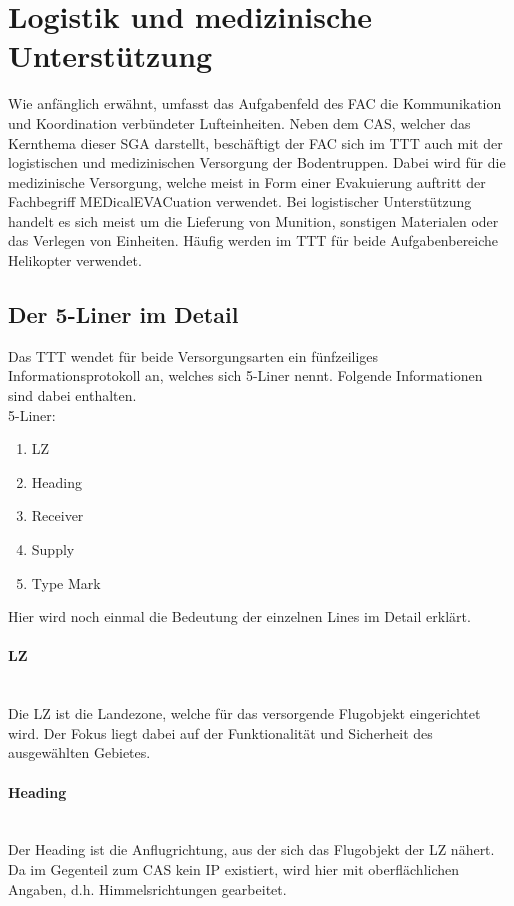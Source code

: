 \section{Logistik und medizinische Unterstützung}
Wie anfänglich erwähnt, umfasst das Aufgabenfeld des FAC die Kommunikation und
Koordination verbündeter Lufteinheiten. Neben dem CAS, welcher das Kernthema dieser
SGA darstellt, beschäftigt der FAC sich im TTT auch mit der logistischen und
medizinischen Versorgung der Bodentruppen. Dabei wird für die medizinische Versorgung,
welche meist in Form einer Evakuierung auftritt der Fachbegriff MEDicalEVACuation
verwendet. Bei logistischer Unterstützung handelt es sich meist um die Lieferung von
Munition, sonstigen Materialen oder das Verlegen von Einheiten. Häufig werden im TTT
für beide Aufgabenbereiche Helikopter verwendet.

\subsection{Der 5-Liner im Detail}
Das TTT wendet für beide Versorgungsarten ein fünfzeiliges Informationsprotokoll an,
welches sich 5-Liner nennt. Folgende Informationen sind dabei enthalten.\\

5-Liner:
\begin{enumerate}
	\item LZ 
	\item Heading
	\item Receiver
	\item Supply
	\item Type Mark
\end{enumerate}

Hier wird noch einmal die Bedeutung der einzelnen Lines im Detail erklärt.
\paragraph*{LZ}\hfil\\
Die LZ ist die Landezone, welche für das versorgende Flugobjekt eingerichtet wird. Der
Fokus liegt dabei auf der Funktionalität und Sicherheit des ausgewählten Gebietes.
\paragraph*{Heading}\hfil\\
Der Heading ist die Anflugrichtung, aus der sich das Flugobjekt der LZ nähert. Da im
Gegenteil zum CAS kein IP existiert, wird hier mit oberflächlichen Angaben, d.h.
Himmelsrichtungen gearbeitet.
